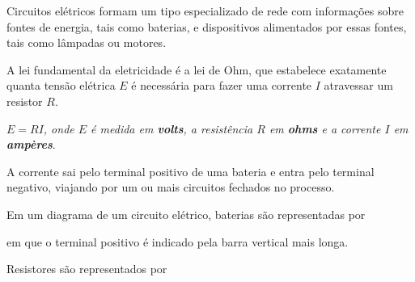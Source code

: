 \documentclass{beamer}
\begin{document}
    \begin{frame}
        Circuitos elétricos formam um tipo especializado de rede com informações sobre fontes de energia, \pause tais como baterias, \pause e dispositivos alimentados por essas fontes, tais como lâmpadas ou motores.\pause

        \vspace{1cm}

        A lei fundamental da eletricidade é a \textrm{lei de Ohm}, \pause que estabelece exatamente quanta tensão elétrica $E$ \pause é necessária para fazer uma corrente $I$ \pause atravessar um resistor $R$.\pause

        \vspace{1cm}
        \begin{tcolorbox}[colback=green!30, colframe=green!80!blue, title=Lei de Ohm]
            \textit{$E = RI$, \pause onde $E$ é medida em \textbf{volts}, \pause a resistência $R$ em \textbf{ohms} \pause e a corrente $I$ em \textbf{ampères}}.
        \end{tcolorbox}

    \end{frame}

    \begin{frame}

        A corrente sai pelo terminal positivo de uma bateria \pause e entra pelo terminal negativo, \pause viajando por um ou mais circuitos fechados no processo.\pause

        \vspace{1cm}

        Em um diagrama de um circuito elétrico, baterias são representadas por
        \begin{center}
        \end{center}\pause
        em que o terminal positivo é indicado pela barra vertical mais longa.\pause

        \vspace{1cm}

        Resistores são representados por
        \begin{center}
        \end{center}
    \end{frame}
\end{document}
